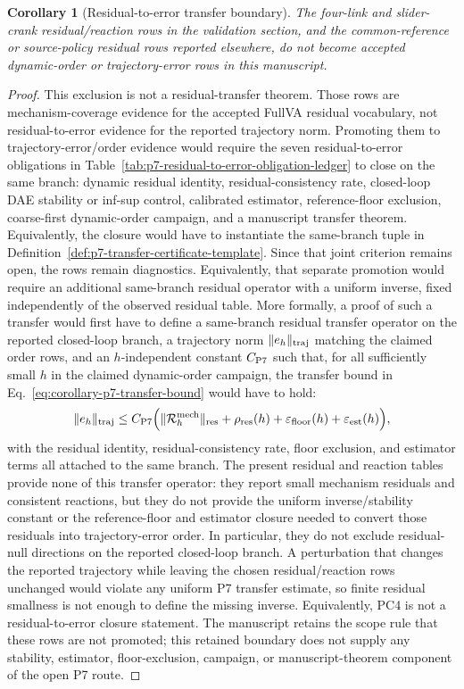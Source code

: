 \documentclass[preprint,12pt]{elsarticle}
\newtheorem{corollary}{Corollary}
\begin{document}
\begin{corollary}[Residual-to-error transfer boundary]
The four-link and slider-crank residual/reaction rows in the validation
section, and the common-reference or source-policy residual rows reported
elsewhere, do not become accepted dynamic-order or trajectory-error rows in
this manuscript.
\end{corollary}

\begin{proof}
This exclusion is not a residual-transfer theorem.
Those rows are mechanism-coverage evidence for the accepted FullVA residual
vocabulary, not residual-to-error evidence for the reported trajectory norm.
Promoting them to trajectory-error/order evidence would require
the seven residual-to-error obligations in
Table~\ref{tab:p7-residual-to-error-obligation-ledger} to close on the same
branch: dynamic residual identity, residual-consistency rate, closed-loop DAE
stability or inf-sup control, calibrated estimator, reference-floor exclusion,
coarse-first dynamic-order campaign, and a manuscript transfer theorem.  Equivalently,
the closure would have to instantiate the same-branch tuple in
Definition~\ref{def:p7-transfer-certificate-template}. Since that joint
criterion remains open, the rows remain diagnostics.
Equivalently, that separate promotion would require an additional same-branch
residual operator with a uniform inverse, fixed independently of the observed
residual table.
More formally, a proof of such a transfer would first have to define a same-branch residual
transfer operator on the reported closed-loop branch, a trajectory norm
\(\|e_h\|_{\rm traj}\) matching the claimed order rows, and an
\(h\)-independent constant \(C_{\rm P7}\) such that, for all sufficiently
small \(h\) in the claimed dynamic-order campaign, the transfer bound in
Eq.~\eqref{eq:corollary-p7-transfer-bound} would have to hold:
\begin{equation}
\label{eq:corollary-p7-transfer-bound}
  \|e_h\|_{\rm traj}
  \le C_{\rm P7}\Bigl(
     \|\mathcal R_h^{\rm mech}\|_{\rm res}
     +\rho_{\rm res}(h)
     +\varepsilon_{\rm floor}(h)
     +\varepsilon_{\rm est}(h)
  \Bigr),
\end{equation}
with the residual identity, residual-consistency rate, floor exclusion, and
estimator terms all attached to the same branch. The present residual and
reaction tables provide none of this transfer operator: they report small
mechanism residuals and consistent reactions, but they do not provide the
uniform inverse/stability constant or the reference-floor and estimator
closure needed to convert those residuals into trajectory-error order.
In particular, they do not exclude residual-null directions on the reported
closed-loop branch.  A perturbation that changes the reported trajectory
while leaving the chosen residual/reaction rows unchanged would violate any
uniform P7 transfer estimate, so finite residual smallness is not enough to
define the missing inverse.
Equivalently, PC4 is not a residual-to-error closure statement.  The
manuscript retains the scope rule that these rows are
not promoted; this retained boundary does not supply any stability,
estimator, floor-exclusion, campaign, or manuscript-theorem component of the
open P7 route.
\end{proof}
\end{document}
